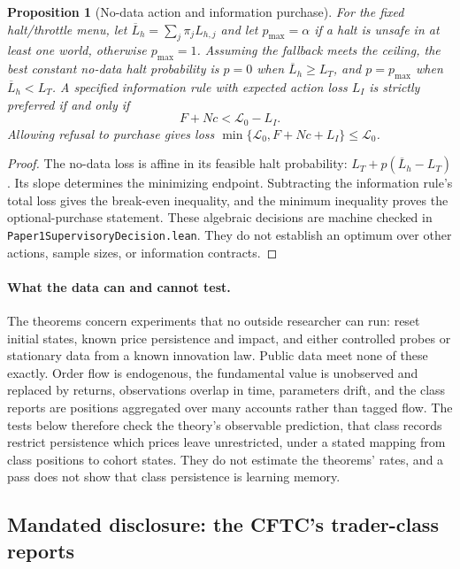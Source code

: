 \documentclass[12pt]{article}
\newtheorem{proposition}[theorem]{Proposition}
\theoremstyle{definition}
\theoremstyle{remark}
\begin{document}
\begin{proposition}[No-data action and information purchase]\label{prop:priced_decision}
For the fixed halt/throttle menu, let $\overline L_h=\sum_j\pi_jL_{h,j}$ and let $p_{\max}=\alpha$ if a halt is unsafe in at least one world, otherwise $p_{\max}=1$. Assuming the fallback meets the ceiling, the best constant no-data halt probability is $p=0$ when $\overline L_h\ge L_T$, and $p=p_{\max}$ when $\overline L_h<L_T$. A specified information rule with expected action loss $L_I$ is strictly preferred if and only if
\[
 F+Nc<\mathcal L_0-L_I.
\]
Allowing refusal to purchase gives loss $\min\{\mathcal L_0,F+Nc+L_I\}\le\mathcal L_0$.
\end{proposition}
\begin{proof}
The no-data loss is affine in its feasible halt probability: $L_T+p(\overline L_h-L_T)$. Its slope determines the minimizing endpoint. Subtracting the information rule's total loss gives the break-even inequality, and the minimum inequality proves the optional-purchase statement. These algebraic decisions are machine checked in \nolinkurl{Paper1SupervisoryDecision.lean}. They do not establish an optimum over other actions, sample sizes, or information contracts.
\end{proof}

\paragraph{What the data can and cannot test.} The theorems concern experiments that no outside researcher can run: reset initial states, known price persistence and impact, and either controlled probes or stationary data from a known innovation law. Public data meet none of these exactly. Order flow is endogenous, the fundamental value is unobserved and replaced by returns, observations overlap in time, parameters drift, and the class reports are positions aggregated over many accounts rather than tagged flow. The tests below therefore check the theory's observable prediction, that class records restrict persistence which prices leave unrestricted, under a stated mapping from class positions to cohort states. They do not estimate the theorems' rates, and a pass does not show that class persistence is learning memory.

\subsection{Mandated disclosure: the CFTC's trader-class reports}\label{sec:cot}
\end{document}
